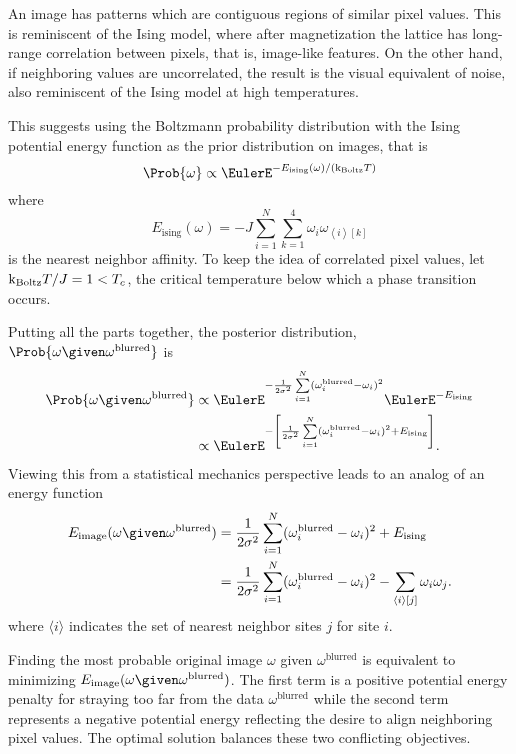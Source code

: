 \documentclass[12pt]{article}
\begin{document}
An image has patterns which are contiguous regions of similar pixel
values.  This is reminiscent of the Ising model, where after
magnetization the lattice has long-range correlation between pixels,
that is, image-like features. On the other hand, if neighboring values
are uncorrelated, the result is the visual equivalent of noise, also
reminiscent of the Ising model at high temperatures.

This suggests using the Boltzmann probability distribution with the
Ising potential energy function as the prior distribution on images,
that is
\[
    \Prob{\omega} \propto \EulerE^{-E_{\text{ising}}(\omega)/({\text k}_
    {\text{Boltz}}T)}
\] where
\[
    E_{\text{ising}}(\omega) = -J \sum\limits_{i=1}^{N} \sum\limits_{k=1}^4
    \omega_i \omega_{\left\langle i \right\rangle[k]}
\] is the nearest neighbor affinity.  To keep the idea of correlated
pixel values, let \( {\text k}_{\text{Boltz}}T/J = 1 < T_c \), the
critical temperature below which a phase transition occurs.

Putting all the parts together, the posterior distribution, \( \Prob{\omega
\given \omega^{\text{blurred}}} \) is
\begin{align*}
    \Prob{\omega \given \omega^{\text{blurred}}} &\propto \EulerE^{-\frac
    {1}{2\sigma^2 } \sum\limits_{i=1}^N(\omega_i^{\text{blurred}} -
    \omega_i)^{2}} \EulerE^{-E_{\text{ising}}} \\
    &\propto \EulerE^{-\left[ \frac{1}{2\sigma^2 } \sum\limits_{i=1}^N(\omega_i^
    {\text{blurred}} - \omega_i)^{2} + E_{\text{ising}} \right] }.
\end{align*}
Viewing this from a statistical mechanics perspective leads to an analog
of an energy function
\begin{align*}
    E_{\text{image}}(\omega \given \omega^{\text{blurred}}) &= \frac{1}{2\sigma^2
    } \sum\limits_{i=1}^N(\omega_i^{\text{blurred}} - \omega_i)^{2} + E_
    {\text{ising}} \\
    &= \frac{1}{2\sigma^2 } \sum\limits_{i=1}^N(\omega_i^{\text{blurred}}
    - \omega_i)^{2} - \sum\limits_{\langle i\rangle [j]} \omega_i\omega_j.
\end{align*}
where \( {\langle i \rangle} \) indicates the set of nearest neighbor
sites \( j \) for site \( i \).

Finding the most probable original image \( \omega \) given \( \omega^{\text
{blurred}} \) is equivalent to minimizing \( E_{\text{image}}(\omega
\given \omega^{\text{blurred}}) \).  The first term is a positive
potential energy penalty for straying too far from the data \( \omega^{\text
{blurred}} \) while the second term represents a negative potential
energy reflecting the desire to align neighboring pixel values.  The
optimal solution balances these two conflicting objectives.
\end{document}
